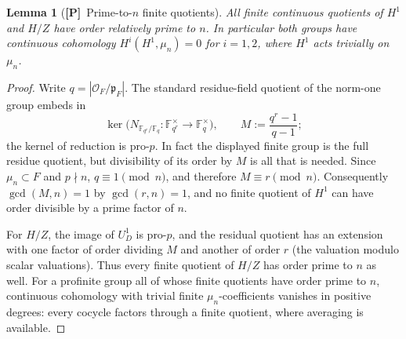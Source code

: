 \documentclass[11pt]{article}
\newcommand{\Ptag}{\textnormal{\textbf{[P]}}}
\theoremstyle{plain}
\newtheorem{lemma}[theorem]{Lemma}
\theoremstyle{definition}
\begin{document}
\begin{lemma}[\Ptag\ Prime-to-$n$ finite quotients]\label{lem:prime-to-n}
All finite continuous quotients of $H^1$ and $H/Z$ have order relatively
prime to $n$. In particular both groups have continuous cohomology
$H^i(H^1,\mu_n)=0$ for $i=1,2$, where $H^1$ acts trivially on $\mu_n$.
\end{lemma}
\begin{proof}
Write $q=|\mathcal O_F/\mathfrak p_F|$. The standard residue-field
quotient of the norm-one group embeds in
\[
\ker\bigl(N_{\mathbb F_{q^r}/\mathbb F_q}:
\mathbb F_{q^r}^\times\longrightarrow\mathbb F_q^\times\bigr),
\qquad M:=\frac{q^r-1}{q-1};
\]
the kernel of reduction is pro-$p$. In fact the displayed finite group
is the full residue quotient, but divisibility of its order by $M$ is
all that is needed. Since $\mu_n\subset F$ and $p\nmid n$,
$q\equiv1\pmod n$, and therefore $M\equiv r\pmod n$.
Consequently $\gcd(M,n)=1$ by $\gcd(r,n)=1$, and no finite quotient
of $H^1$ can have order divisible by a prime factor of $n$.

For $H/Z$, the image of $U_D^1$ is pro-$p$, and the residual quotient
has an extension with one factor of order dividing $M$ and another
of order $r$ (the valuation modulo scalar valuations). Thus every
finite quotient of $H/Z$ has order prime to $n$ as well.
For a profinite group all of whose finite quotients have order
prime to $n$, continuous cohomology with trivial finite
$\mu_n$-coefficients vanishes in positive degrees: every cocycle
factors through a finite quotient, where averaging is available.
\end{proof}
\end{document}
